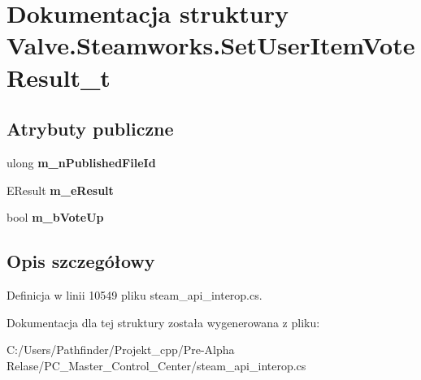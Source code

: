 \hypertarget{struct_valve_1_1_steamworks_1_1_set_user_item_vote_result__t}{}\section{Dokumentacja struktury Valve.\+Steamworks.\+Set\+User\+Item\+Vote\+Result\+\_\+t}
\label{struct_valve_1_1_steamworks_1_1_set_user_item_vote_result__t}
\subsection*{Atrybuty publiczne}
\begin{DoxyCompactItemize}
\item 
\mbox{\label{struct_valve_1_1_steamworks_1_1_set_user_item_vote_result__t_a5e2d6cc1134bfa8d3d8f0e116e18c647}} 
ulong {\bfseries m\+\_\+n\+Published\+File\+Id}
\item 
\mbox{\label{struct_valve_1_1_steamworks_1_1_set_user_item_vote_result__t_abad4b985896aa459650985c16fc6e6d3}} 
E\+Result {\bfseries m\+\_\+e\+Result}
\item 
\mbox{\label{struct_valve_1_1_steamworks_1_1_set_user_item_vote_result__t_a29b73c2b809d3d37b21963f949f8f21a}} 
bool {\bfseries m\+\_\+b\+Vote\+Up}
\end{DoxyCompactItemize}


\subsection{Opis szczegółowy}


Definicja w linii 10549 pliku steam\+\_\+api\+\_\+interop.\+cs.



Dokumentacja dla tej struktury została wygenerowana z pliku\+:\begin{DoxyCompactItemize}
\item 
C\+:/\+Users/\+Pathfinder/\+Projekt\+\_\+cpp/\+Pre-\/\+Alpha Relase/\+P\+C\+\_\+\+Master\+\_\+\+Control\+\_\+\+Center/steam\+\_\+api\+\_\+interop.\+cs\end{DoxyCompactItemize}
